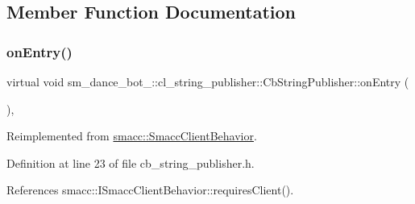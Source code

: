\subsection{Member Function Documentation}
\mbox{\label{classsm__dance__bot__2_1_1cl__string__publisher_1_1CbStringPublisher_abc3c362ea55110f8d340e5cb4d901892}} 
\subsubsection{\texorpdfstring{on\+Entry()}{onEntry()}}
{\footnotesize\ttfamily virtual void sm\+\_\+dance\+\_\+bot\+\_\+::cl\+\_\+string\+\_\+publisher\+::\+Cb\+String\+Publisher\+::on\+Entry (\begin{DoxyParamCaption}{ }\end{DoxyParamCaption})\hspace{0.3cm}{\ttfamily [inline]}, {\ttfamily [virtual]}}



Reimplemented from \hyperlink{classsmacc_1_1SmaccClientBehavior_ad5d3e1f1697c3cfe66c94cadba948493}{smacc\+::\+Smacc\+Client\+Behavior}.



Definition at line 23 of file cb\+\_\+string\+\_\+publisher.\+h.



References smacc\+::\+I\+Smacc\+Client\+Behavior\+::requires\+Client().


